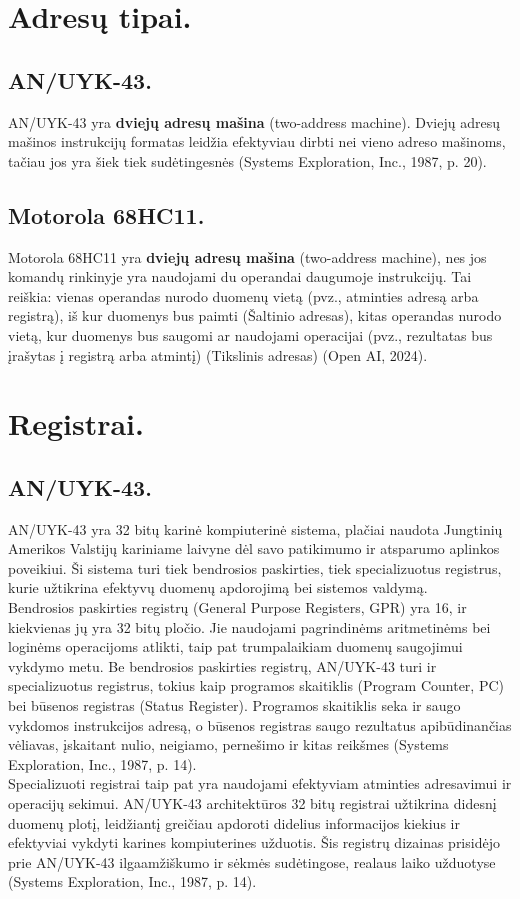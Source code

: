 \documentclass[a4paper,12pt]{article}
\begin{document}
\section{Adresų tipai.}
\subsection{AN/UYK-43.}
AN/UYK-43 yra \textbf{dviejų adresų mašina} (two-address machine). Dviejų adresų mašinos instrukcijų formatas leidžia efektyviau dirbti nei vieno adreso mašinoms, tačiau jos yra šiek tiek sudėtingesnės (Systems Exploration, Inc., 1987, p. 20).
\subsection{Motorola 68HC11.}
Motorola 68HC11 yra \textbf{dviejų adresų mašina} (two-address machine), nes jos komandų rinkinyje yra naudojami du operandai daugumoje instrukcijų. Tai reiškia: vienas operandas nurodo duomenų vietą (pvz., atminties adresą arba registrą), iš kur duomenys bus paimti (Šaltinio adresas), kitas operandas nurodo vietą, kur duomenys bus saugomi ar naudojami operacijai (pvz., rezultatas bus įrašytas į registrą arba atmintį) (Tikslinis adresas) (Open AI, 2024).

\section{Registrai.}
\subsection{AN/UYK-43.}
AN/UYK-43 yra 32 bitų karinė kompiuterinė sistema, plačiai naudota Jungtinių Amerikos Valstijų kariniame laivyne dėl savo patikimumo ir atsparumo aplinkos poveikiui. Ši sistema turi tiek bendrosios paskirties, tiek specializuotus registrus, kurie užtikrina efektyvų duomenų apdorojimą bei sistemos valdymą.\\
Bendrosios paskirties registrų (General Purpose Registers, GPR) yra 16, ir kiekvienas jų yra 32 bitų pločio. Jie naudojami pagrindinėms aritmetinėms bei loginėms operacijoms atlikti, taip pat trumpalaikiam duomenų saugojimui vykdymo metu. Be bendrosios paskirties registrų, AN/UYK-43 turi ir specializuotus registrus, tokius kaip programos skaitiklis (Program Counter, PC) bei būsenos registras (Status Register). Programos skaitiklis seka ir saugo vykdomos instrukcijos adresą, o būsenos registras saugo rezultatus apibūdinančias vėliavas, įskaitant nulio, neigiamo, pernešimo ir kitas reikšmes (Systems Exploration, Inc., 1987, p. 14).\\
Specializuoti registrai taip pat yra naudojami efektyviam atminties adresavimui ir operacijų sekimui. AN/UYK-43 architektūros 32 bitų registrai užtikrina didesnį duomenų plotį, leidžiantį greičiau apdoroti didelius informacijos kiekius ir efektyviai vykdyti karines kompiuterines užduotis. Šis registrų dizainas prisidėjo prie AN/UYK-43 ilgaamžiškumo ir sėkmės sudėtingose, realaus laiko užduotyse (Systems Exploration, Inc., 1987, p. 14).
\end{document}
